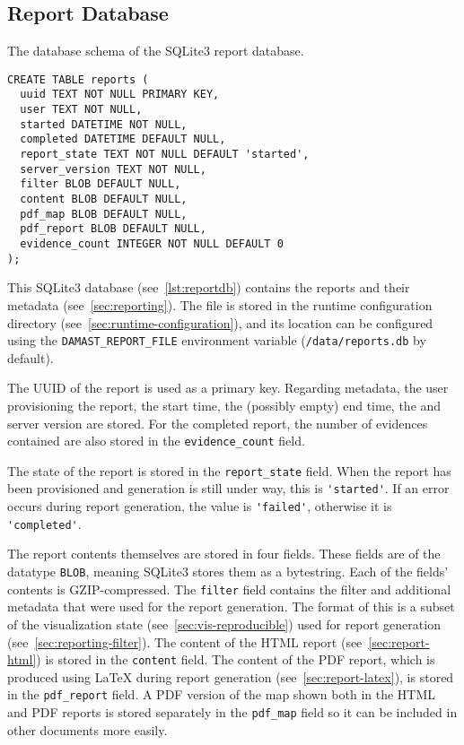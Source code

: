 \subsection{Report Database}
\label{sec:report-database}

\begin{lstfloat}
  \centering
  \caption{The database schema of the SQLite3 report database.}
  \label{lst:reportdb}

  \begin{lstlisting}
CREATE TABLE reports (
  uuid TEXT NOT NULL PRIMARY KEY,
  user TEXT NOT NULL,
  started DATETIME NOT NULL,
  completed DATETIME DEFAULT NULL,
  report_state TEXT NOT NULL DEFAULT 'started',
  server_version TEXT NOT NULL,
  filter BLOB DEFAULT NULL,
  content BLOB DEFAULT NULL,
  pdf_map BLOB DEFAULT NULL,
  pdf_report BLOB DEFAULT NULL,
  evidence_count INTEGER NOT NULL DEFAULT 0
);
  \end{lstlisting}
\end{lstfloat}

This SQLite3 database (see~\cref{lst:reportdb}) contains the reports and their metadata (see~\cref{sec:reporting}).
The file is stored in the runtime configuration directory (see~\cref{sec:runtime-configuration}), and its location can be configured using the \verb!DAMAST_REPORT_FILE! environment variable (\verb!/data/reports.db! by default).

The UUID of the report is used as a primary key.
Regarding metadata, the user provisioning the report, the start time, the (possibly empty) end time, the and server version are stored.
For the completed report, the number of evidences contained are also stored in the \verb!evidence_count! field.

The state of the report is stored in the \verb!report_state! field.
When the report has been provisioned and generation is still under way, this is \verb!'started'!.
If an error occurs during report generation, the value is \verb!'failed'!, otherwise it is \verb!'completed'!.

The report contents themselves are stored in four fields.
These fields are of the datatype \verb!BLOB!, meaning SQLite3 stores them as a bytestring.
Each of the fields' contents is GZIP-compressed.
The \verb!filter! field contains the filter and additional metadata that were used for the report generation.
The format of this is a subset of the visualization state (see~\cref{sec:vis-reproducible}) used for report generation (see~\cref{sec:reporting-filter}).
The content of the HTML report (see~\cref{sec:report-html}) is stored in the \verb!content! field.
The content of the PDF report, which is produced using \LaTeX{} during report generation (see~\cref{sec:report-latex}), is stored in the \verb!pdf_report! field.
A PDF version of the map shown both in the HTML and PDF reports is stored separately in the \verb!pdf_map! field so it can be included in other documents more easily.


